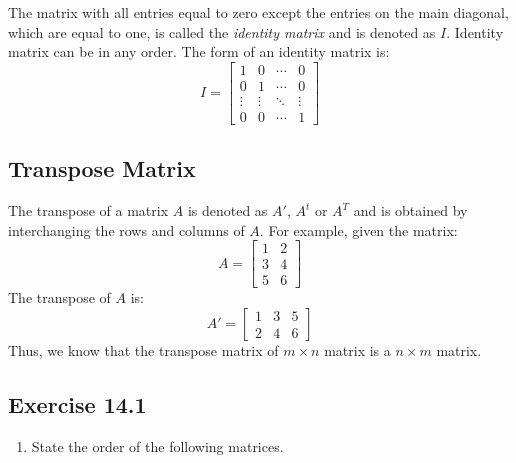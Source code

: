 \documentclass{report}
\begin{document}
\begin{multicols}{2}
    \doublespacing{}

    The matrix with all entries equal to zero except the entries on the main
    diagonal, which are equal to one, is called the \emph{identity matrix} and is
    denoted as $I$. Identity matrix can be in any order. The form of an identity
    matrix is:
    \[
        I = \begin{bmatrix}
            1      & 0      & \cdots & 0      \\
            0      & 1      & \cdots & 0      \\
            \vdots & \vdots & \ddots & \vdots \\
            0      & 0      & \cdots & 1
        \end{bmatrix}
    \]

    \singlespacing{}

    \subsection*{Transpose Matrix}

    \doublespacing{}

    The transpose of a matrix $A$ is denoted as $A'$, $A^t$ or $A^T$ and is
    obtained by interchanging the rows and columns of $A$. For example, given the
    matrix:
    \[
        A = \begin{bmatrix}
            1 & 2 \\
            3 & 4 \\
            5 & 6
        \end{bmatrix}
    \]
    The transpose of $A$ is:
    \[
        A' = \begin{bmatrix}
            1 & 3 & 5 \\
            2 & 4 & 6
        \end{bmatrix}
    \]
    Thus, we know that the transpose matrix of $m \times n$ matrix is a $n \times
        m$ matrix.

    \singlespacing{}

    \subsection{Exercise 14.1}

    \begin{enumerate}
        \item State the order of the following matrices.

              \begin{enumerate}


\end{enumerate}
\end{enumerate}
\end{multicols}
\end{document}
